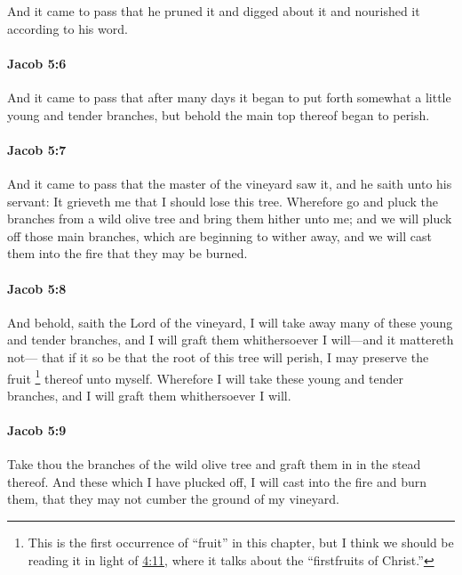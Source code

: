 			And it came to pass that he pruned it and digged about it and nourished it
			according to his word.

		\paragraph{Jacob 5:6} %
			\label{JACOB-5-6}

			And it came to pass that after many days
			it began to put forth somewhat a little young and tender branches,
			but behold the main top thereof began to perish.

		\paragraph{Jacob 5:7} %
			\label{JACOB-5-7}

			And it came to pass that the master of the vineyard saw it,
			and he saith unto his servant:
			It grieveth me that I should lose this tree.
			Wherefore go and pluck the branches from a wild olive tree
			and bring them hither unto me;
			and we will pluck off those main branches,
			which are beginning to wither away,
			and we will cast them into the fire that they may be burned.

		\paragraph{Jacob 5:8} %
			\label{JACOB-5-8}

			And behold, saith the Lord of the vineyard,
			I will take away many of these young and tender branches,
			and I will graft them whithersoever I will---and it mattereth not---
			that if it so be that the root of this tree will perish,
			I may preserve the fruit%
				\footnote{%
					This is the first occurrence of ``fruit'' in this chapter, but I think we should be reading it in light of \hyperref[JACOB-4-11]{4:11}, where it talks about the ``firstfruits of Christ.''
					}
			thereof unto myself.
			Wherefore I will take these young and tender branches,
			and I will graft them whithersoever I will.

		\paragraph{Jacob 5:9} %
			\label{JACOB-5-9}

			Take thou the branches of the wild olive tree
			and graft them in in the stead thereof.
			And these which I have plucked off,
			I will cast into the fire and burn them,
			that they may not cumber the ground of my vineyard.

